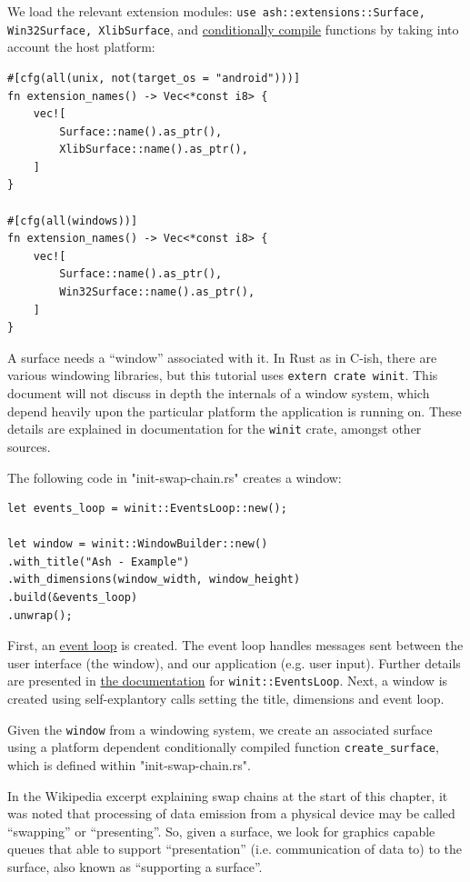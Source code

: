 \documentclass[12pt,letterpaper]{article}
\newcommand{\inquotes}[1]{``#1''}	%
\newcommand{\ril}[1]{\texttt{#1}}
\begin{document}
	We load the relevant extension modules: \ril{use ash::extensions::{Surface, Win32Surface, XlibSurface}}, and \href{https://doc.rust-lang.org/book/first-edition/conditional-compilation.html}{conditionally compile} functions by taking into account the host platform:
\begin{verbatim}
#[cfg(all(unix, not(target_os = "android")))]
fn extension_names() -> Vec<*const i8> {
	vec![
		Surface::name().as_ptr(),
		XlibSurface::name().as_ptr(),
	]
}

#[cfg(all(windows))]
fn extension_names() -> Vec<*const i8> {
	vec![
		Surface::name().as_ptr(),
		Win32Surface::name().as_ptr(),
	]
}
\end{verbatim}

	A surface needs a \inquotes{window} associated with it. In Rust as in C-ish, there are various windowing libraries, but this tutorial uses \ril{extern crate winit}. This document will not discuss in depth the internals of a window system, which depend heavily upon the particular platform the application is running on. These details are explained in documentation for the \ril{winit} crate, amongst other sources.
	
	The following code in "init-swap-chain.rs" creates a window:
		\begin{verbatim}
let events_loop = winit::EventsLoop::new();

let window = winit::WindowBuilder::new()
.with_title("Ash - Example")
.with_dimensions(window_width, window_height)
.build(&events_loop)
.unwrap();
		\end{verbatim}
			
	First, an \href{https://en.wikipedia.org/wiki/Event_loop#Windows_applications}{event loop} is created. The event loop handles messages sent between the user interface (the window), and our application (e.g. user input). Further details are presented in \href{https://docs.rs/winit/0.10.0/winit/struct.EventsLoop.html}{the documentation} for \ril{winit::EventsLoop}. Next, a window is created using self-explantory calls setting the title, dimensions and event loop. 
        
    Given the \ril{window} from a windowing system, we create an associated surface using a platform dependent conditionally compiled function \ril{create_surface}, which is defined within "init-swap-chain.rs". 
        
    In the Wikipedia excerpt explaining swap chains at the start of this chapter, it was noted that processing of data emission from a physical device may be called \inquotes{swapping} or \inquotes{presenting}. So, given a surface, we look for graphics capable queues that able to support \inquotes{presentation} (i.e. communication of data to) to the surface, also known as \inquotes{supporting a surface}.  
        
\end{document}

